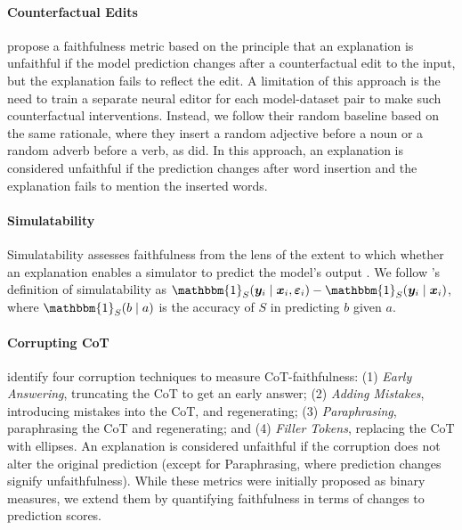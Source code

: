 \paragraph{Counterfactual Edits} \citet{Atanasova2023FaithfulnessTF} propose a faithfulness metric based on the principle that an explanation is unfaithful if the model prediction changes after a counterfactual edit to the input, but the explanation fails to reflect the edit. A limitation of this approach is the need to train a separate neural editor for each model-dataset pair to make such counterfactual interventions. Instead, we follow their random baseline based on the same rationale, where they insert a random adjective before a noun or a random adverb before a verb, as \citet{Parcalabescu2023OnMF} did. In this approach, an explanation is considered unfaithful if the prediction changes after word insertion and the explanation fails to mention the inserted words.

\paragraph{Simulatability} Simulatability assesses faithfulness from the lens of the extent to which whether an explanation enables a simulator to predict the model's output  \citep{DoshiVelez2017TowardsAR, Hase2020EvaluatingEA, Hase2020LeakageAdjustedSC, Wiegreffe2020MeasuringAB, Chan2022FRAMEER}. We follow \citet{Chan2022FRAMEER}'s definition of simulatability as $\mathbbm{1}_S (\vy_i \mid \vx_i, \vvarepsilon_i) - \mathbbm{1}_S (\vy_i \mid \vx_i)$, where $\mathbbm{1}_S(b \mid a)$ is the accuracy of $S$ in predicting $b$ given $a$.

\paragraph{Corrupting CoT} \citet{Lanham2023MeasuringFI} identify four corruption techniques to measure CoT-faithfulness: (1) \textit{Early Answering}, truncating the CoT to get an early answer; (2) \textit{Adding Mistakes}, introducing mistakes into the CoT, and regenerating; (3) \textit{Paraphrasing}, paraphrasing the CoT and regenerating; and (4) \textit{Filler Tokens}, replacing the CoT with ellipses. An explanation is considered unfaithful if the corruption does not alter the original prediction (except for Paraphrasing, where prediction changes signify unfaithfulness). While these metrics were initially proposed as binary measures, we extend them by quantifying faithfulness in terms of changes to prediction scores.

